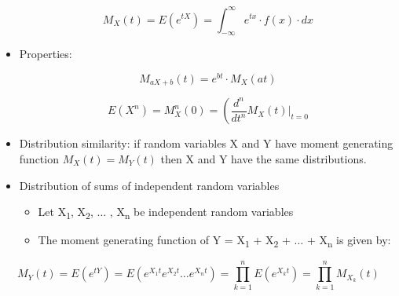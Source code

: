 \documentclass[12pt]{report}
\renewcommand{\_}{\kern-1.5pt\textunderscore\kern-1.5pt}
\begin{document}
\begin{itemize}
 \[ M_{X} \left( t \right) =E \left( e^{tX} \right) = \int _{-\infty}^{\infty}e^{tx} \cdot f \left( x \right)  \cdot dx \] \par

	\item Properties:\par

 \[ M_{aX+b} \left( t \right) =e^{bt} \cdot M_{X} \left( at \right)  \] \par

 \[ E \left( X^{n} \right) =M_{X}^{n} \left( 0 \right) = \left( \frac{d^{n}}{dt^{n}}M_{X} \left( t \right)  \vert _{t=0} \] \par

	\item Distribution similarity: if random variables X and Y have moment generating function  \( M_{X} \left( t \right) =M_{Y} \left( t \right)  \)  then X and Y have the same distributions. \par

	\item Distribution of sums of independent random variables \par

\begin{itemize}
	\item Let X\textsubscript{1}, X\textsubscript{2}, $ \ldots $ , X\textsubscript{n} be independent random variables\par

	\item The moment generating function of Y = X\textsubscript{1} + X\textsubscript{2} + $ \ldots $  + X\textsubscript{n} is given by:
\end{itemize}
\end{itemize}\par

\begin{adjustwidth}{1.0in}{0.0in}
 \[ M_{Y} \left( t \right) =E \left( e^{tY} \right) =E \left( e^{X_{1}t}e^{X_{2}t} \ldots e^{X_{n}t} \right) = \prod_{k=1}^{n}E \left( e^{X_{k}t} \right) = \prod_{k=1}^{n}M_{X_{k}} \left( t \right)  \] \par

\end{adjustwidth}
\end{document}
